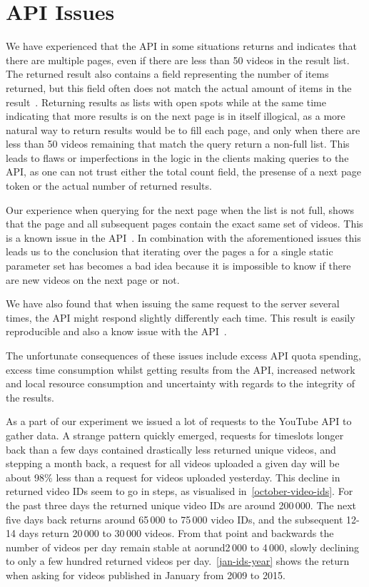\section{API Issues}
We have experienced that the API in some situations returns and indicates that
there are multiple pages, even if there are less than 50 videos in the result
list. The returned result also contains a field representing the number of items
returned, but this field often does not match the actual amount of items in the 
result~\cite[Issue 5173]{conclusion:gdataissue}. Returning results as lists with
open spots while at the same time indicating that more results is on the next
page is in itself illogical, as a more natural way to return results would be to
fill each page, and only when there are less than 50 videos remaining that match
the query return a non-full list. This leads to flaws or imperfections in the 
logic in the clients making queries to the API, as one can not trust either the
total count field, the presense of a next page token or the actual number of
returned results.

Our experience when querying for the next page when the list is not full, shows
that the page and all subsequent pages contain the exact same set of videos. 
This is a known issue in the API~\cite[Issue 6406]{conclusion:gdataissue}. In 
combination with the aforementioned issues this leads us to the conclusion that 
iterating over the pages a for a single static parameter set has becomes a bad 
idea because it is impossible to know if there are new videos on the next page 
or not. %

We have also found that when issuing the same request to the server several
times, the API might respond slightly differently each time. This result is
easily reproducible and also a know issue with the 
API~\cite[Issue 4275]{conclusion:gdataissue}. 

The unfortunate consequences of these issues include excess API quota spending,
excess time consumption whilst getting results from the API, increased network
and local resource consumption and uncertainty with regards to the integrity of
the results. 

As a part of our experiment we issued a lot of requests to the YouTube API to
gather data. A strange pattern quickly emerged, requests for timeslots longer
back than a few days contained drastically less returned unique videos, and 
stepping a month back, a request for all videos uploaded a given day will be 
about 98\% less than a request for videos uploaded yesterday. This decline in
returned video IDs seem to go in steps, as visualised
in~\cref{october-video-ids}. For the past three days the returned unique video
IDs are around 200\,000. The next five days back returns around 65\,000 to 
75\,000 video IDs, and the subsequent 12-14 days return 20\,000 to 30\,000
videos. From that point and backwards the number of videos per day remain
stable at aorund2\,000 to 4\,000, slowly declining to only a few hundred
returned videos per day.~\ref{jan-ids-year} shows the return when asking for 
videos published in January from 2009 to 2015. 

